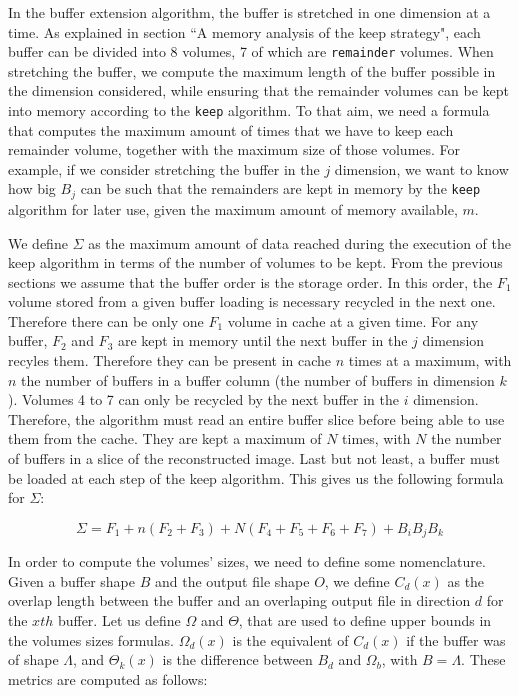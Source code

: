 \documentclass[conference]{IEEEtran}
\begin{document}
In the buffer extension algorithm, the buffer is stretched in one dimension at a
time. As explained in section ``A memory analysis of the keep strategy", each
buffer can be divided into 8 volumes, 7 of which are \texttt{remainder} volumes.
When stretching the buffer, we compute the maximum length of the buffer possible
in the dimension considered, while ensuring that the remainder volumes can be
kept into memory according to the \texttt{keep} algorithm. To that aim, we need
a formula that computes the maximum amount of times that we have to keep each
remainder volume, together with the maximum size of those volumes. For example, if
we consider stretching the buffer in the $j$ dimension, we want to know how big
$B_j$ can be such that the remainders are kept in memory by the \texttt{keep}
algorithm for later use, given the maximum amount of memory available, $m$.

We define $\Sigma$ as the maximum amount of data reached during the execution
of the keep algorithm in terms of the number of volumes to be kept. From the
previous sections we assume that the buffer order is the storage order. In this
order, the $F_1$ volume stored from a given buffer loading is necessary recycled
in the next one. Therefore there can be only one $F_1$ volume in cache at a
given time. For any buffer, $F_2$ and $F_3$ are kept in memory until the next
buffer in the $j$ dimension recyles them. Therefore they can be present in cache
$n$ times at a maximum, with $n$ the number of buffers in a buffer column (the
number of buffers in dimension $k$). Volumes 4 to 7 can only be recycled by the
next buffer in the $i$ dimension. Therefore, the algorithm must read an entire
buffer slice before being able to use them from the cache. They are kept a
maximum of $N$ times, with $N$ the number of buffers in a slice of the
reconstructed image. Last but not least, a buffer must be loaded at each step of
the keep algorithm. This gives us the following formula for $\Sigma$:

$$\Sigma = F_1 + n(F_2 + F_3) + N(F_4 + F_5 + F_6 + F_7) + B_iB_jB_k$$

In order to compute the volumes' sizes, we need to define some nomenclature.
Given a buffer shape $B$ and the output file shape $O$, we define $C_d(x)$ as
the overlap length between the buffer and an overlaping output file in direction
$d$ for the $x{th}$ buffer. Let us define $\Omega$ and $\Theta$, that are used
to define upper bounds in the volumes sizes formulas. $\Omega_d(x)$ is the
equivalent of $C_d(x)$ if the buffer was of shape $\Lambda$, and $\Theta_k(x)$
is the difference between $B_d$ and $\Omega_b$, with $B=\Lambda$.
These metrics are computed as follows:
\end{document}
